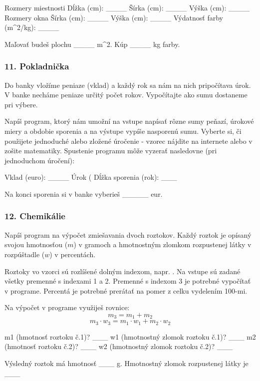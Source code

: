 \begin{code}
Rozmery miestnosti
Dĺžka (cm): ____
Šírka (cm): ____
Výška (cm): ____
Rozmery okna
Šírka (cm): ____
Výška (cm): ____
Výdatnosť farby (m^2/kg): ____

Maľovať budeš plochu ____ m^2. Kúp ____ kg farby.
\end{code}

\subsubsection*{11. Pokladnička}
Do banky vložíme peniaze (vklad)  a každý rok sa nám na nich pripočítava úrok. V banke necháme peniaze určitý počet rokov. Vypočítajte ako sumu dostaneme pri výbere.

Napíš program, ktorý nám umožní na vstupe napísať rôzne sumy peňazí, úrokové miery a obdobie sporenia a na výstupe vypíše nasporenú sumu. Vyberte si, či použijete jednoduché alebo zložené úročenie - vzorec nájdite na internete alebo v zošite matematiky. Spustenie programu môže vyzerať nasledovne (pri jednoduchom úročení):

\begin{code}
Vklad (euro): ____
Úrok (%
Dĺžka sporenia (rok): ___

Na konci sporenia si v banke vyberieš _____ eur.
\end{code}

\subsubsection*{12. Chemikálie}
Napíš program na výpočet zmiešavania dvoch roztokov. Každý roztok je opísaný svojou hmotnosťou ($m$) v gramoch a hmotnostným zlomkom rozpustenej látky v rozpúštadle ($w$) v percentách.
 
Roztoky vo vzorci sú rozlíšené dolným indexom, napr. . Na vstupe sú zadané všetky premenné s indexami 1 a 2. Premenné s indexom 3 je potrebné vypočítať v programe.  Percentá je potrebné prerátať na pomer z celku vydelením 
100-mi.

Na výpočet v programe využiješ rovnice:
$$m_3 = m_1 + m_2$$
$$m_3 \cdot w_3 = m_1 \cdot w_1 +  m_2 \cdot w_2$$

\begin{code}
m1 (hmotnosť roztoku č.1)? ___
w1 (hmotnostný zlomok roztoku č.1)? ___
m2 (hmotnosť roztoku č.2)? ___
w2 (hmotnostný zlomok roztoku č.2)? ___

Výsledný roztok má hmotnosť ___ g.
Hmotnostný zlomok rozpustenej látky je ___ %
\end{code}


